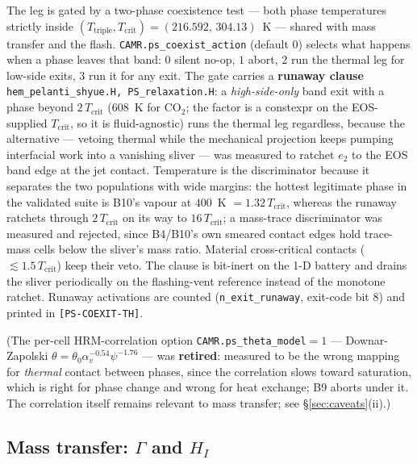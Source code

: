 \documentclass[11pt,a4paper]{article}
\newcommand{\code}[1]{\texttt{\small #1}}
\newcommand{\src}[1]{{\color{gray}\code{#1}}}
\begin{document}
The leg is gated by a two-phase coexistence test --- both phase temperatures
strictly inside $(T_{\mathrm{triple}},T_{\mathrm{crit}}) = (216.592,\,304.13)$~K
--- shared with mass transfer and the flash.  \code{CAMR.ps\_coexist\_action}
(default $0$) selects what happens when a phase leaves that band: $0$ silent
no-op, $1$ abort, $2$ run the thermal leg for low-side exits, $3$ run it for
any exit.  The gate carries a \textbf{runaway clause}
\src{hem\_pelanti\_shyue.H, PS\_relaxation.H}: a \emph{high-side-only}
band exit with a phase beyond $2\,T_{\mathrm{crit}}$ ($608$~K for CO$_2$; the
factor is a constexpr on the EOS-supplied $T_{\mathrm{crit}}$, so it is
fluid-agnostic) runs the thermal leg regardless, because the alternative ---
vetoing thermal while the mechanical projection keeps pumping interfacial
work into a vanishing sliver --- was measured to ratchet $e_2$ to the EOS band
edge at the jet contact.  Temperature is the discriminator because it
separates the two populations with wide margins: the hottest legitimate phase
in the validated suite is B10's vapour at $400$~K $=1.32\,T_{\mathrm{crit}}$,
whereas the runaway ratchets through $2\,T_{\mathrm{crit}}$ on its way to
$16\,T_{\mathrm{crit}}$; a mass-trace discriminator was measured and rejected,
since B4/B10's own smeared contact edges hold trace-mass cells below the
sliver's mass ratio.  Material cross-critical contacts
($\lesssim1.5\,T_{\mathrm{crit}}$) keep their veto.  The clause is
bit-inert on the 1-D battery and drains the sliver periodically on the
flashing-vent reference instead of the monotone ratchet.  Runaway activations
are counted (\code{n\_exit\_runaway}, exit-code bit 8) and printed in
\code{[PS-COEXIT-TH]}.

(The per-cell HRM-correlation option \code{CAMR.ps\_theta\_model}$=1$ ---
Downar-Zapolski $\theta=\theta_0\alpha_v^{-0.54}\psi^{-1.76}$ --- was
\textbf{retired}: measured to be the wrong mapping for
\emph{thermal} contact between phases, since the correlation slows toward
saturation, which is right for phase change and wrong for heat exchange;
B9 aborts under it.  The correlation itself remains relevant to mass
transfer; see \S\ref{sec:caveats}(ii).)

\subsection{Mass transfer: $\Gamma$ and $H_{\!I}$}
\end{document}
